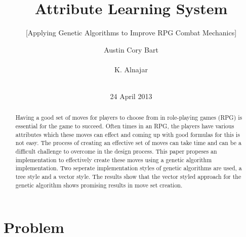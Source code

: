 \documentclass{acm_proc_article-sp}
\begin{document}
\title{Attribute Learning System}
\subtitle{[Applying Genetic Algorithms to Improve RPG Combat Mechanics]} %



\author{
\alignauthor
Austin Cory Bart\\
       \\
\alignauthor
K. Alnajar\\
       \\
\alignauthor
}

\date{24 April 2013}

\maketitle
\begin{abstract}
Having a good set of moves for players to choose from in role-playing games (RPG) is essential for the game to succeed.  Often times in an RPG, the players have various attributes which these moves can effect and coming up with good formulas for this is not easy. The process of creating an effective set of moves can take time and can be a difficult challenge to overcome in the design process. This paper propeses an implementation to effectively create these moves using a genetic algorithm implementation. Two seperate implementation styles of genetic algorithms are used, a tree style and a vector style. The results show that the vector styled approach for the genetic algorithm shows promising results in move set creation.
\end{abstract}




\section{Problem}
\end{document}
